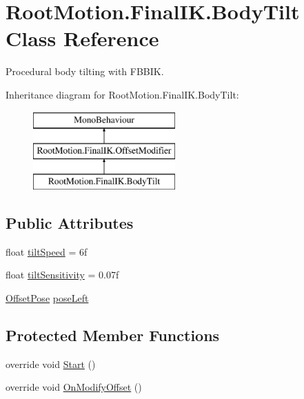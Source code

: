 \hypertarget{class_root_motion_1_1_final_i_k_1_1_body_tilt}{}\section{Root\+Motion.\+Final\+I\+K.\+Body\+Tilt Class Reference}
\label{class_root_motion_1_1_final_i_k_1_1_body_tilt}


Procedural body tilting with F\+B\+B\+IK.  


Inheritance diagram for Root\+Motion.\+Final\+I\+K.\+Body\+Tilt\+:\begin{figure}[H]
\begin{center}
\leavevmode
\includegraphics[height=3.000000cm]{class_root_motion_1_1_final_i_k_1_1_body_tilt}
\end{center}
\end{figure}
\subsection*{Public Attributes}
\begin{DoxyCompactItemize}
\item 
float \mbox{\hyperlink{class_root_motion_1_1_final_i_k_1_1_body_tilt_ac9a17a4d8cccc129acc9fb7b57a63bfd}{tilt\+Speed}} = 6f
\item 
float \mbox{\hyperlink{class_root_motion_1_1_final_i_k_1_1_body_tilt_acf202114ecedbce2d3a8278db6d2cc20}{tilt\+Sensitivity}} = 0.\+07f
\item 
\mbox{\hyperlink{class_root_motion_1_1_final_i_k_1_1_offset_pose}{Offset\+Pose}} \mbox{\hyperlink{class_root_motion_1_1_final_i_k_1_1_body_tilt_afb29d61c5e1d9b6f979778cc223ace5f}{pose\+Left}}
\end{DoxyCompactItemize}
\subsection*{Protected Member Functions}
\begin{DoxyCompactItemize}
\item 
override void \mbox{\hyperlink{class_root_motion_1_1_final_i_k_1_1_body_tilt_a221000faf3644c7bda0c809ba09acff4}{Start}} ()
\item 
override void \mbox{\hyperlink{class_root_motion_1_1_final_i_k_1_1_body_tilt_a5a68b6792b8b58c5a5aa24ace1569526}{On\+Modify\+Offset}} ()
\end{DoxyCompactItemize}
